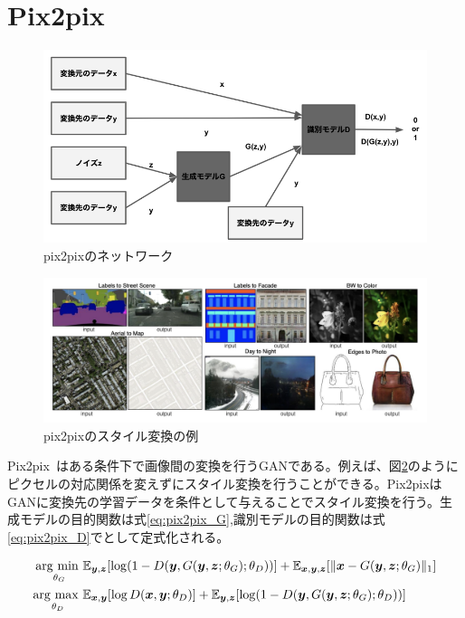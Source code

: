 \section{Pix2pix}

\begin{figure}[t]
\begin{center}
\includegraphics[width=\hsize]{figure/pix2pix_net.png}
\caption{pix2pixのネットワーク}
\label{fig:pix2pix_net}
\end{center}
\end{figure}

\begin{figure}[t]
\begin{center}
\includegraphics[width=\hsize]{figure/pix2pix_img.png}
\caption{pix2pixのスタイル変換の例}
\label{fig:pix2pix_img}
\end{center}
\end{figure}

Pix2pix~\cite{pix2pix}はある条件下で画像間の変換を行うGANである。例えば、図\ref{fig:pix2pix_img}のようにピクセルの対応関係を変えずにスタイル変換を行うことができる。Pix2pixはGANに変換先の学習データを条件として与えることでスタイル変換を行う。生成モデルの目的関数は式\ref{eq:pix2pix_G},識別モデルの目的関数は式\ref{eq:pix2pix_D}でとして定式化される。

\begin{align}
    \label{eq:pix2pix_G}
    \mathop{\rm arg~min~}\limits _{\theta_G}& \mathbb{E}_{\boldsymbol{y}, \boldsymbol{z}}[\log (1-D(\boldsymbol{y}, G(\boldsymbol{y}, \boldsymbol{z}; \theta_G); \theta_D))]+\mathbb{E}_{\boldsymbol{x}, \boldsymbol{y}, \boldsymbol{z}}[\|\boldsymbol{x}-G(\boldsymbol{y}, \boldsymbol{z}; \theta_G)\|_{1}]\\
    \label{eq:pix2pix_D}
    \mathop{\rm arg~max~}\limits _{\theta_D}& \mathbb{E}_{\boldsymbol{x}, \boldsymbol{y}}[\log D(\boldsymbol{x}, \boldsymbol{y}; \theta_D)]+\mathbb{E}_{\boldsymbol{y}, \boldsymbol{z}}[\log (1-D(\boldsymbol{y}, G(\boldsymbol{y}, \boldsymbol{z}; \theta_G); \theta_D))]
\end{align}


